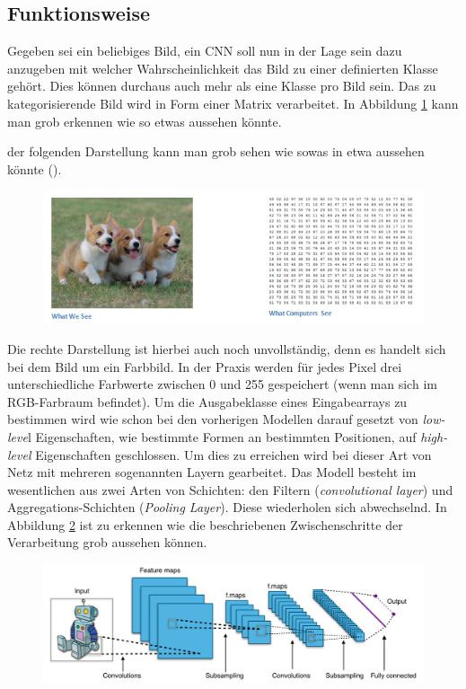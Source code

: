 \subsection{Funktionsweise}
Gegeben sei ein beliebiges Bild, ein CNN soll nun in der Lage sein dazu anzugeben mit welcher Wahrscheinlichkeit das Bild zu einer definierten Klasse gehört. Dies können durchaus auch mehr als eine Klasse pro Bild sein. Das zu kategorisierende Bild wird in Form einer Matrix verarbeitet. In Abbildung \ref{fig:puppies} kann man grob erkennen wie so etwas aussehen könnte.

der folgenden Darstellung kann man grob sehen wie sowas in etwa aussehen könnte (). 

\begin{figure}[!htb]
	\centering
	\includegraphics[width=.9\linewidth]{img/humanVsPc}
	\label{fig:puppies}
\end{figure}

Die rechte Darstellung ist hierbei auch noch unvollständig, denn es handelt sich bei dem Bild um ein Farbbild. In der Praxis werden für jedes Pixel drei unterschiedliche Farbwerte zwischen 0 und 255 gespeichert (wenn man sich im RGB-Farbraum befindet). Um die Ausgabeklasse eines Eingabearrays zu bestimmen wird wie schon bei den vorherigen Modellen darauf gesetzt von \emph{low-leve}l Eigenschaften, wie bestimmte Formen an bestimmten Positionen, auf \emph{high-level} Eigenschaften geschlossen. Um dies zu erreichen wird bei dieser Art von Netz mit mehreren sogenannten Layern gearbeitet. Das Modell besteht im wesentlichen aus zwei Arten von Schichten: den Filtern (\emph{convolutional layer}) und Aggregations-Schichten (\emph{Pooling Layer}). Diese wiederholen sich abwechselnd. In Abbildung \ref{fig:cnnOverview} ist zu erkennen wie die beschriebenen Zwischenschritte der Verarbeitung grob aussehen können. 

\begin{figure}[!htb]
	\centering
	\includegraphics[width=.9\linewidth]{img/cnn_overview}
	\label{fig:cnnOverview}
\end{figure}

